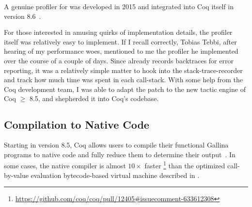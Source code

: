 A genuine profiler for \Ltac\space was developed in 2015 and integrated into Coq itself in version 8.6~\cite{coqpl-15-ltac-profiler}.

For those interested in amusing quirks of implementation details, the profiler itself was relatively easy to implement.
If I recall correctly, Tobias Tebbi, after hearing of my \Ltac\space performance woes, mentioned to me the profiler he implemented over the course of a couple of days.
Since \Ltac\space already records backtraces for error reporting, it was a relatively simple matter to hook into the stack-trace-recorder and track how much time was spent in each call-stack.
With some help from the Coq development team, I was able to adapt the patch to the new tactic engine of Coq $\ge$ 8.5, and shepherded it into Coq's codebase.


\subsection{Compilation to Native Code}\label{sec:native-compiler}
Starting in version 8.5, Coq allows users to compile their functional Gallina programs to native code and fully reduce them to determine their output~\cite{nativecompute,coq-commit-native-compiler}.
In some cases, the native compiler is almost $10\times$ faster%
\footnote{\url{https://github.com/coq/coq/pull/12405\#issuecomment-633612308}}
than the optimized call-by-value evaluation bytecode-based virtual machine described in \textcite{Gregoire-Leroy-02}.

